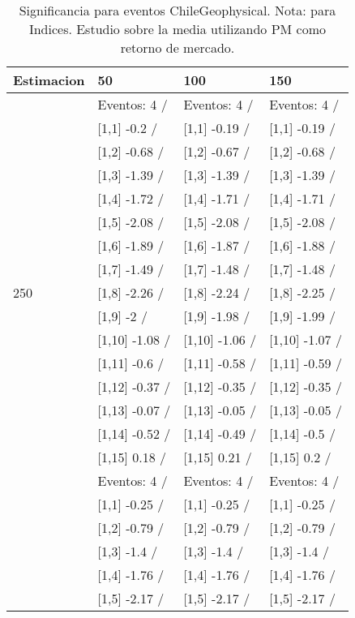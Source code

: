 \begin{table}

\caption{Significancia para eventos ChileGeophysical. Nota: para Indices. Estudio sobre la media utilizando PM como retorno de mercado.}
\centering
\begin{tabular}[t]{llll}
\toprule
Estimacion & 50 & 100 & 150\\
\midrule
 & Eventos:  4 / & Eventos:  4 / & Eventos:  4 /\\
 & {}[1,1] -0.2  / & {}[1,1] -0.19  / & {}[1,1] -0.19  /\\
 & {}[1,2] -0.68  / & {}[1,2] -0.67  / & {}[1,2] -0.68  /\\
 & {}[1,3] -1.39  / & {}[1,3] -1.39  / & {}[1,3] -1.39  /\\
 & {}[1,4] -1.72  / & {}[1,4] -1.71  / & {}[1,4] -1.71  /\\
\addlinespace
 & {}[1,5] -2.08  / & {}[1,5] -2.08  / & {}[1,5] -2.08  /\\
 & {}[1,6] -1.89  / & {}[1,6] -1.87  / & {}[1,6] -1.88  /\\
 & {}[1,7] -1.49  / & {}[1,7] -1.48  / & {}[1,7] -1.48  /\\
250 & {}[1,8] -2.26  / & {}[1,8] -2.24  / & {}[1,8] -2.25  /\\
 & {}[1,9] -2  / & {}[1,9] -1.98  / & {}[1,9] -1.99  /\\
\addlinespace
 & {}[1,10] -1.08  / & {}[1,10] -1.06  / & {}[1,10] -1.07  /\\
 & {}[1,11] -0.6  / & {}[1,11] -0.58  / & {}[1,11] -0.59  /\\
 & {}[1,12] -0.37  / & {}[1,12] -0.35  / & {}[1,12] -0.35  /\\
 & {}[1,13] -0.07  / & {}[1,13] -0.05  / & {}[1,13] -0.05  /\\
 & {}[1,14] -0.52  / & {}[1,14] -0.49  / & {}[1,14] -0.5  /\\
\addlinespace
 & {}[1,15] 0.18  / & {}[1,15] 0.21  / & {}[1,15] 0.2  /\\
 & Eventos:  4 / & Eventos:  4 / & Eventos:  4 /\\
 & {}[1,1] -0.25  / & {}[1,1] -0.25  / & {}[1,1] -0.25  /\\
 & {}[1,2] -0.79  / & {}[1,2] -0.79  / & {}[1,2] -0.79  /\\
 & {}[1,3] -1.4  / & {}[1,3] -1.4  / & {}[1,3] -1.4  /\\
\addlinespace
 & {}[1,4] -1.76  / & {}[1,4] -1.76  / & {}[1,4] -1.76  /\\
 & {}[1,5] -2.17  / & {}[1,5] -2.17  / & {}[1,5] -2.17  /\\

\end{tabular}
\end{table}
